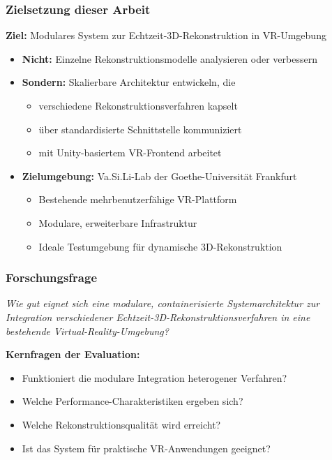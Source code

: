 \begin{frame}
\frametitle{Zielsetzung dieser Arbeit}

\textbf{Ziel:} Modulares System zur Echtzeit-3D-Rekonstruktion in VR-Umgebung

\bigskip

\begin{itemize}
  \item \textbf{Nicht:} Einzelne Rekonstruktionsmodelle analysieren oder verbessern
  
  \item \textbf{Sondern:} Skalierbare Architektur entwickeln, die
  \begin{itemize}
    \item verschiedene Rekonstruktionsverfahren kapselt
    \item über standardisierte Schnittstelle kommuniziert
    \item mit Unity-basiertem VR-Frontend arbeitet
  \end{itemize}
  
  \item \textbf{Zielumgebung:} Va.Si.Li-Lab der Goethe-Universität Frankfurt
  \begin{itemize}
    \item Bestehende mehrbenutzerfähige VR-Plattform
    \item Modulare, erweiterbare Infrastruktur
    \item Ideale Testumgebung für dynamische 3D-Rekonstruktion
  \end{itemize}
\end{itemize}

\end{frame}

\begin{frame}
\frametitle{Forschungsfrage}

\Large
\centering

\textit{Wie gut eignet sich eine modulare, containerisierte Systemarchitektur zur Integration verschiedener Echtzeit-3D-Rekonstruktionsverfahren in eine bestehende Virtual-Reality-Umgebung?}

\vspace{2cm}

\normalsize
\textbf{Kernfragen der Evaluation:}
\begin{itemize}
  \item Funktioniert die modulare Integration heterogener Verfahren?
  \item Welche Performance-Charakteristiken ergeben sich?
  \item Welche Rekonstruktionsqualität wird erreicht?
  \item Ist das System für praktische VR-Anwendungen geeignet?
\end{itemize}

\end{frame}